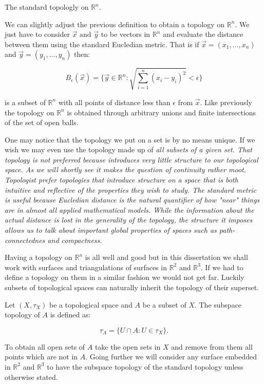 \begin{ex} The standard topologly on $\mathbb{R}^n$.  \end{ex}

We can slightly adjust the previous definition to obtain a topology on $\mathbb{R}^n$. We just have to consider $\vec{x} \text{ and } \vec{y}$ to be vectors in $\mathbb{R}^n$ and evaluate the distance between them using the standard Eucledian metric. That is if $\vec{x} = (x_1, ..., x_n)$ and $\vec{y} = (y_1, ..., y_n)$ then:

$$ B_\epsilon(\vec{x}) = \{\vec{y} \in \mathbb{R}^n : \sqrt{\sum_{i = 1}^{n}{(x_i - y_i) ^ 2}} < \epsilon \} $$

is a subset of $\mathbb{R}^n$ with all points of distance less than $\epsilon$ from $\vec{x}$. Like previously the topology on $\mathbb{R}^n$ is obtained through arbitrary unions and finite intersections of the set of open balls.


One may notice that the topology we put on a set is by no means unique. If we wish we may even use the topology made up of \em all \em subsets of a given set. That topology is not preferred because introduces very little structure to our topological space. As we will shortly see it makes the question of continuity rather moot. Topologist prefer topologies that introduce structure on a space that is both intuitive and reflective of the properties they wish to study. The standard metric is useful because Eucledian distance is the natural quantifier of how "near" things are in almost all applied mathematical models. While the information about the actual distance is lost in the generality of the topology, the structure it imposes allows us to talk about important global properties of spaces such as path-connectednes and compactness.

Having a topology on $\mathbb{R}^n$ is all well and good but in this dissertation we shall work with surfaces and triangulations of surfaces in $\mathbb{R}^2$ and $\mathbb{R}^3$. If we had to define a topology on them in a similar fashion we would not get far. Luckily subsets of topological spaces can naturally inherit the topology of their superset.

\begin{defn} Let $(X, \tau_X)$ be a topological space and $A$ be a subset of $X$. The subspace topology of $A$ is defined as: \end{defn}

$$ \tau_A = \{U \cap A: U \in \tau_X\}.$$

To obtain all open sets of $A$ take the open sets in $X$ and remove from them all points which are not in $A$. Going further we will consider any surface embedded in $\mathbb{R}^2$ and $\mathbb{R}^3$ to have the subspace topology of the standard topology unless otherwise stated.

